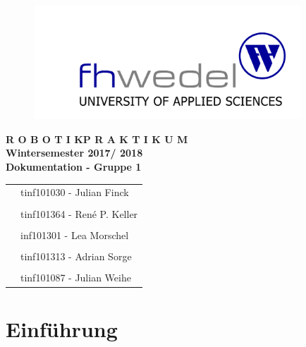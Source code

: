 \documentclass[12pt, a4paper]{scrartcl}
\begin{document}

\begin{center}
	
	\begin{figure}[H]
		\centering
		\includegraphics[width=10cm]{Bilder/fh-wedel-logo.png}
	\end{figure}

	\vspace*{1.5cm}
	\Large{\textbf{ R O B O T I K\quad P R A K T I K U M \\ Wintersemester 2017/ 2018\\}}
	\vspace*{1.5cm}
	\huge{\textbf{Dokumentation - Gruppe 1\\}}
	\vspace*{1.5cm}
	
	\vfill
	\begin{table}[h]\centering
		\begin{tabular}{l l}
			 &  tinf101030 - Julian Finck \\
			 & \\
			 & tinf101364 - René P. Keller  \\
			 & \\
			 & inf101301 - Lea Morschel \\
			 & \\
			 & tinf101313 - Adrian Sorge \\
			 & \\
			 & tinf101087 - Julian Weihe \\
		\end{tabular}
	\end{table}

\end{center}


\newpage
\tableofcontents %
\newpage



\section{Einführung}
\end{document}
